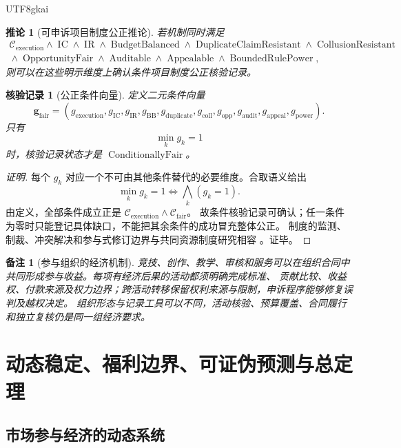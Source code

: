 \documentclass[12pt,a4paper,openany]{report}
\newtheorem{corollary}{推论}[chapter]
\newtheorem{remark}{备注}[chapter]
\newtheorem{Certificate}{核验记录}[chapter]
\DeclareMathOperator{\Auditable}{Auditable}
\DeclareMathOperator{\Appealable}{Appealable}
\DeclareMathOperator{\BudgetBalanced}{BudgetBalanced}
\DeclareMathOperator{\IC}{IC}
\DeclareMathOperator{\IR}{IR}
\DeclareMathOperator{\DuplicateClaimResistant}{DuplicateClaimResistant}
\DeclareMathOperator{\CollusionResistant}{CollusionResistant}
\DeclareMathOperator{\OpportunityFair}{OpportunityFair}
\begin{document}
\begin{CJK*}{UTF8}{gkai}
\begin{corollary}[可申诉项目制度公正推论]
\label{cor:appealable-governance-fairness}
若机制同时满足
\[
  \begin{gathered}
    \mathcal C_{\mathrm{execution}}
    \wedge\IC\wedge\IR\wedge\BudgetBalanced
    \wedge\DuplicateClaimResistant\wedge\CollusionResistant\\
    {}\wedge\OpportunityFair
    \wedge\Auditable\wedge\Appealable
    \wedge\operatorname{BoundedRulePower},
  \end{gathered}
\]
则可以在这些明示维度上确认条件项目制度公正核验记录。
\end{corollary}

\begin{Certificate}[公正条件向量]
定义二元条件向量
\[
  \mathbf g_{\mathrm{fair}}
  =
  (g_{\mathrm{execution}},g_{\mathrm{IC}},g_{\mathrm{IR}},g_{\mathrm{BB}},
  g_{\mathrm{duplicate}},g_{\mathrm{coll}},g_{\mathrm{opp}},
  g_{\mathrm{audit}},g_{\mathrm{appeal}},g_{\mathrm{power}}).
\]
只有
\[
  \min_k g_k=1
\]
时，核验记录状态才是 \(\operatorname{ConditionallyFair}\)。
\end{Certificate}

\begin{proof}[证明]
每个 \(g_k\) 对应一个不可由其他条件替代的必要维度。合取语义给出
\[
  \min_k g_k=1
  \Longleftrightarrow
  \bigwedge_k(g_k=1).
\]
由定义，全部条件成立正是 \(\mathcal C_{\mathrm{execution}}\wedge\mathcal C_{\mathrm{fair}}\)。
故条件核验记录可确认；任一条件为零时只能登记具体缺口，不能把其余条件的成功冒充整体公正。
制度的监测、制裁、冲突解决和参与式修订边界与共同资源制度研究相容
\cite{Ostrom1990Commons}。证毕。
\end{proof}

\begin{remark}[参与组织的经济机制]
竞技、创作、教学、审核和服务可以在组织合同中共同形成参与收益。每项有经济后果的活动都须明确完成标准、
贡献比较、收益权、付款来源及权力边界；跨活动转移保留权利来源与限制，申诉程序能够修复误判及越权决定。
组织形态与记录工具可以不同，活动核验、预算覆盖、合同履行和独立复核仍是同一组经济要求。
\end{remark}
\clearpage
\chapter{动态稳定、福利边界、可证伪预测与总定理}
\label{chap:stability-synthesis}

\section{市场参与经济的动态系统}


\end{CJK*}
\end{document}
